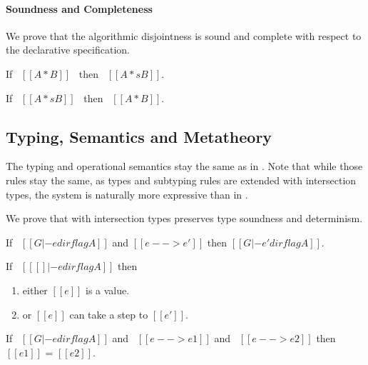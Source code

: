 \paragraph{Soundness and Completeness}

We prove that the algorithmic disjointness is sound and complete with respect to
the declarative specification.

\begin{lemma}
  If \ $[[A * B]]$ \ then \ $[[A *s B]]$.
\label{lemma:inter:disj-sound}
\end{lemma}

\begin{lemma}
  If \ $[[A *s B]]$ \ then \ $[[A * B]]$.
\label{lemma:inter:disj-complete}
\end{lemma}


\subsection{Typing, Semantics and Metatheory}

The typing and operational semantics stay the same as in . Note
that while those rules stay the same, as types and subtyping rules are extended
with intersection types, the system is naturally more expressive than
in .

We prove that \cal with intersection types preserves type soundness and determinism.

\begin{lemma}
\label{lemma:inter:preservation}
  If \ $[[G |- e dirflag A]]$ and $[[e --> e']]$ then $[[G |- e' dirflag A]]$.
\end{lemma}

\begin{lemma}[Progress]
\label{lemma:inter:progress}
If \ $[[ [] |- e dirflag A]]$ then
 \begin{enumerate}
  \item either $[[e]]$ is a value.
  \item or $[[e]]$ can take a step to $[[e']]$.
  \end{enumerate}
\end{lemma}

\begin{theorem}[Determinism]
\label{lemma:union:determinism}
  If \ $[[G |- e dirflag A]]$ and \ $[[e --> e1]]$ and \ $[[e --> e2]]$ then $[[e1]]$ = $[[e2]]$.
\end{theorem}

